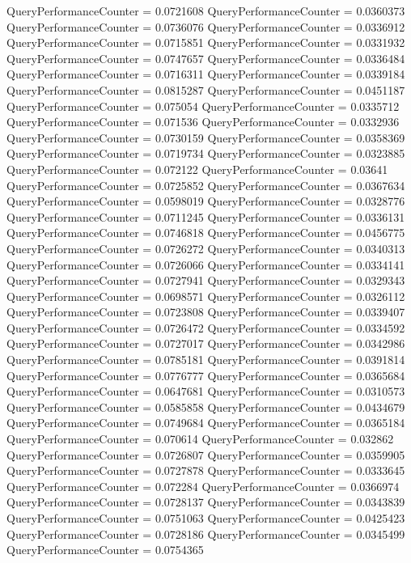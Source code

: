 \documentclass[9pt]{article}
\theoremstyle{plain}
\theoremstyle{definition}
\theoremstyle{remark}
\numberwithin{equation}{section}
\begin{document}
QueryPerformanceCounter  =  0.0721608
QueryPerformanceCounter  =  0.0360373
QueryPerformanceCounter  =  0.0736076
QueryPerformanceCounter  =  0.0336912
QueryPerformanceCounter  =  0.0715851
QueryPerformanceCounter  =  0.0331932
QueryPerformanceCounter  =  0.0747657
QueryPerformanceCounter  =  0.0336484
QueryPerformanceCounter  =  0.0716311
QueryPerformanceCounter  =  0.0339184
QueryPerformanceCounter  =  0.0815287
QueryPerformanceCounter  =  0.0451187
QueryPerformanceCounter  =  0.075054
QueryPerformanceCounter  =  0.0335712
QueryPerformanceCounter  =  0.071536
QueryPerformanceCounter  =  0.0332936
QueryPerformanceCounter  =  0.0730159
QueryPerformanceCounter  =  0.0358369
QueryPerformanceCounter  =  0.0719734
QueryPerformanceCounter  =  0.0323885
QueryPerformanceCounter  =  0.072122
QueryPerformanceCounter  =  0.03641
QueryPerformanceCounter  =  0.0725852
QueryPerformanceCounter  =  0.0367634
QueryPerformanceCounter  =  0.0598019
QueryPerformanceCounter  =  0.0328776
QueryPerformanceCounter  =  0.0711245
QueryPerformanceCounter  =  0.0336131
QueryPerformanceCounter  =  0.0746818
QueryPerformanceCounter  =  0.0456775
QueryPerformanceCounter  =  0.0726272
QueryPerformanceCounter  =  0.0340313
QueryPerformanceCounter  =  0.0726066
QueryPerformanceCounter  =  0.0334141
QueryPerformanceCounter  =  0.0727941
QueryPerformanceCounter  =  0.0329343
QueryPerformanceCounter  =  0.0698571
QueryPerformanceCounter  =  0.0326112
QueryPerformanceCounter  =  0.0723808
QueryPerformanceCounter  =  0.0339407
QueryPerformanceCounter  =  0.0726472
QueryPerformanceCounter  =  0.0334592
QueryPerformanceCounter  =  0.0727017
QueryPerformanceCounter  =  0.0342986
QueryPerformanceCounter  =  0.0785181
QueryPerformanceCounter  =  0.0391814
QueryPerformanceCounter  =  0.0776777
QueryPerformanceCounter  =  0.0365684
QueryPerformanceCounter  =  0.0647681
QueryPerformanceCounter  =  0.0310573
QueryPerformanceCounter  =  0.0585858
QueryPerformanceCounter  =  0.0434679
QueryPerformanceCounter  =  0.0749684
QueryPerformanceCounter  =  0.0365184
QueryPerformanceCounter  =  0.070614
QueryPerformanceCounter  =  0.032862
QueryPerformanceCounter  =  0.0726807
QueryPerformanceCounter  =  0.0359905
QueryPerformanceCounter  =  0.0727878
QueryPerformanceCounter  =  0.0333645
QueryPerformanceCounter  =  0.072284
QueryPerformanceCounter  =  0.0366974
QueryPerformanceCounter  =  0.0728137
QueryPerformanceCounter  =  0.0343839
QueryPerformanceCounter  =  0.0751063
QueryPerformanceCounter  =  0.0425423
QueryPerformanceCounter  =  0.0728186
QueryPerformanceCounter  =  0.0345499
QueryPerformanceCounter  =  0.0754365
\end{document}
